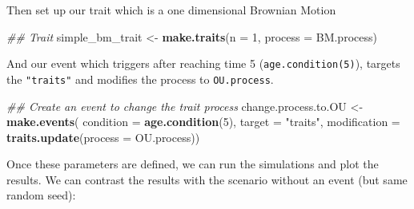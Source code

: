 \documentclass[
]{book}
\newenvironment{Shaded}{\begin{snugshade}}{\end{snugshade}}
\newcommand{\CommentTok}[1]{\textcolor[rgb]{0.56,0.35,0.01}{\textit{#1}}}
\newcommand{\DataTypeTok}[1]{\textcolor[rgb]{0.13,0.29,0.53}{#1}}
\newcommand{\DecValTok}[1]{\textcolor[rgb]{0.00,0.00,0.81}{#1}}
\newcommand{\KeywordTok}[1]{\textcolor[rgb]{0.13,0.29,0.53}{\textbf{#1}}}
\newcommand{\NormalTok}[1]{#1}
\newcommand{\StringTok}[1]{\textcolor[rgb]{0.31,0.60,0.02}{#1}}
\begin{document}
Then set up our trait which is a one dimensional Brownian Motion

\begin{Shaded}
\begin{Highlighting}[]
\CommentTok{\#\# Trait}
\NormalTok{simple\_bm\_trait \textless{}{-}}\StringTok{ }\KeywordTok{make.traits}\NormalTok{(}\DataTypeTok{n =} \DecValTok{1}\NormalTok{, }\DataTypeTok{process =}\NormalTok{ BM.process)}
\end{Highlighting}
\end{Shaded}

And our event which triggers after reaching time 5 (\texttt{age.condition(5)}), targets the \texttt{"traits"} and modifies the process to \texttt{OU.process}.

\begin{Shaded}
\begin{Highlighting}[]
\CommentTok{\#\# Create an event to change the trait process}
\NormalTok{change.process.to.OU \textless{}{-}}\StringTok{ }\KeywordTok{make.events}\NormalTok{(}
                  \DataTypeTok{condition    =} \KeywordTok{age.condition}\NormalTok{(}\DecValTok{5}\NormalTok{),}
                  \DataTypeTok{target       =} \StringTok{"traits"}\NormalTok{,}
                  \DataTypeTok{modification =} \KeywordTok{traits.update}\NormalTok{(}\DataTypeTok{process =}\NormalTok{ OU.process))}
\end{Highlighting}
\end{Shaded}

Once these parameters are defined, we can run the simulations and plot the results.
We can contrast the results with the scenario without an event (but same random seed):
\end{document}
